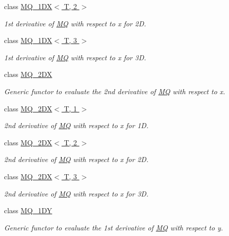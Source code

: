 \begin{CompactItemize}
class \hyperlink{classRBF_1_1MQ__1DX_3_01T_00_012_01_4}{MQ\_\-1DX$<$ T, 2 $>$}
\begin{CompactList}\small\item\em 1st derivative of \hyperlink{classRBF_1_1MQ}{MQ} with respect to x for 2D. \item\end{CompactList}\item 
class \hyperlink{classRBF_1_1MQ__1DX_3_01T_00_013_01_4}{MQ\_\-1DX$<$ T, 3 $>$}
\begin{CompactList}\small\item\em 1st derivative of \hyperlink{classRBF_1_1MQ}{MQ} with respect to x for 3D. \item\end{CompactList}\item 
class \hyperlink{classRBF_1_1MQ__2DX}{MQ\_\-2DX}
\begin{CompactList}\small\item\em Generic functor to evaluate the 2nd derivative of \hyperlink{classRBF_1_1MQ}{MQ} with respect to x. \item\end{CompactList}\item 
class \hyperlink{classRBF_1_1MQ__2DX_3_01T_00_011_01_4}{MQ\_\-2DX$<$ T, 1 $>$}
\begin{CompactList}\small\item\em 2nd derivative of \hyperlink{classRBF_1_1MQ}{MQ} with respect to x for 1D. \item\end{CompactList}\item 
class \hyperlink{classRBF_1_1MQ__2DX_3_01T_00_012_01_4}{MQ\_\-2DX$<$ T, 2 $>$}
\begin{CompactList}\small\item\em 2nd derivative of \hyperlink{classRBF_1_1MQ}{MQ} with respect to x for 2D. \item\end{CompactList}\item 
class \hyperlink{classRBF_1_1MQ__2DX_3_01T_00_013_01_4}{MQ\_\-2DX$<$ T, 3 $>$}
\begin{CompactList}\small\item\em 2nd derivative of \hyperlink{classRBF_1_1MQ}{MQ} with respect to x for 3D. \item\end{CompactList}\item 
class \hyperlink{classRBF_1_1MQ__1DY}{MQ\_\-1DY}
\begin{CompactList}\small\item\em Generic functor to evaluate the 1st derivative of \hyperlink{classRBF_1_1MQ}{MQ} with respect to y. \item\end{CompactList}\item 

\end{CompactItemize}
